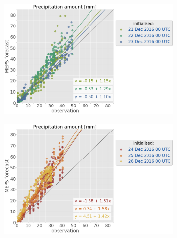 \begin{figure}
	\begin{subfigure}[b]{0.49\textwidth}
		\includegraphics[trim={0.cm 0cm 12.5cm 0cm},clip,
		width=\textwidth]{./fig_sfc_precip/obs_model_20161221_23_00}
		\caption{}\label{fig:scat:precip2123}
	\end{subfigure}
	\begin{subfigure}[b]{0.49\textwidth}
		\includegraphics[trim={0.cm 0cm 12.5cm 0cm},clip,
		width=\textwidth]{./fig_sfc_precip/obs_model_20161224_26_00}

\end{subfigure}
\end{figure}
